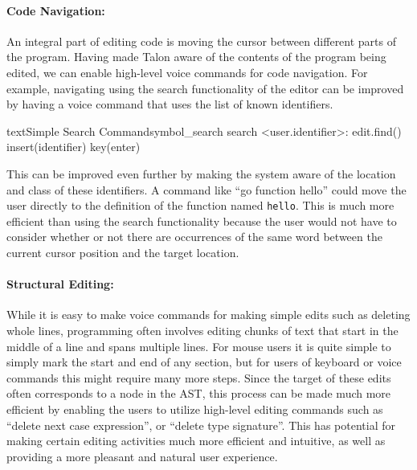 \documentclass[../thesis.tex]{subfiles}
\begin{document}
\paragraph{Code Navigation:}%
\label{code_navigation}
An integral part of editing code is moving the cursor between different parts of the program.
Having made Talon aware of the contents of the program being edited, we can enable
high-level voice commands for code navigation.
For example, navigating using the search functionality of the editor can be improved
by having a voice command that uses the list of known identifiers.
\begin{code}{text}{Simple Search Command}{symbol_search}
search <user.identifier>: 
    edit.find()
    insert(identifier)
    key(enter)
\end{code}
This can be improved even further by making the system aware of the
location and class of these identifiers.
A command like ``go function hello'' could move the user directly to the definition of the function named \texttt{hello}.
This is much more efficient than using the search functionality because the user would not have to
consider whether or not there are occurrences of the same word between the current cursor position
and the target location.

\paragraph{Structural Editing:}%
\label{structural_editing}
While it is easy to make voice commands for making simple edits such as deleting whole lines,
programming often involves editing chunks of text that start in the middle of a line
and spans multiple lines. 
For mouse users it is quite simple to simply mark the start and end of any section, but for 
users of keyboard or voice commands this might require many more steps.
Since the target of these edits often corresponds to a node in the AST, this process
can be made much more efficient by enabling the users to utilize high-level editing commands
such as ``delete next case expression'', or ``delete type signature''.
This has potential for making certain editing activities much more efficient and intuitive,
as well as providing a more pleasant and natural user experience.
\end{document}
